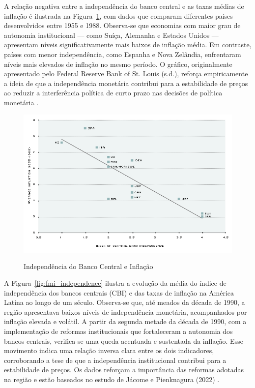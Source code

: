 \documentclass[a4paper,12pt]{article}
\begin{document}
A relação negativa entre a independência do banco central e as taxas médias de inflação é ilustrada na Figura~\ref{fig:fed_independence}, com dados que comparam diferentes países desenvolvidos entre 1955 e 1988. Observa-se que economias com maior grau de autonomia institucional — como Suíça, Alemanha e Estados Unidos — apresentam níveis significativamente mais baixos de inflação média. Em contraste, países com menor independência, como Espanha e Nova Zelândia, enfrentaram níveis mais elevados de inflação no mesmo período. O gráfico, originalmente apresentado pelo Federal Reserve Bank of St. Louis (s.d.), reforça empiricamente a ideia de que a independência monetária contribui para a estabilidade de preços ao reduzir a interferência política de curto prazo nas decisões de política monetária \cite{stlouisfed-independencia}.

\begin{figure}[H]
    \centering
    \caption{Independência do Banco Central e Inflação}
    \includegraphics[width=.85\linewidth]{Imagens/paperi1.png}
    \label{fig:fed_independence}
\end{figure}

A Figura~\ref{fig:fmi_independence} ilustra a evolução da média do índice de independência dos bancos centrais (CBI) e das taxas de inflação na América Latina ao longo de um século. Observa-se que, até meados da década de 1990, a região apresentava baixos níveis de independência monetária, acompanhados por inflação elevada e volátil. A partir da segunda metade da década de 1990, com a implementação de reformas institucionais que fortaleceram a autonomia dos bancos centrais, verifica-se uma queda acentuada e sustentada da inflação. Esse movimento indica uma relação inversa clara entre os dois indicadores, corroborando a tese de que a independência institucional contribui para a estabilidade de preços. Os dados reforçam a importância das reformas adotadas na região e estão baseados no estudo de Jácome e Pienknagura (2022) \cite{jacome2022}.
\end{document}
